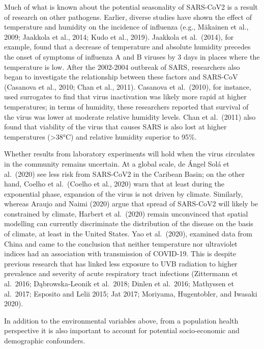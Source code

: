 \documentclass[]{elsarticle} %
\begin{document}
Much of what is known about the potential seasonality of SARS-CoV2 is a
result of research on other pathogens. Earlier, diverse studies have
shown the effect of temperature and humidity on the incidence of
influenza (e.g., Mäkainen et al., 2009; Jaakkola et al., 2014; Kudo et
al., 2019). Jaakkola et al.~(2014), for example, found that a decrease
of temperature and absolute humidity precedes the onset of symptoms of
influenza A and B viruses by 3 days in places where the temperature is
low. After the 2002-2004 outbreak of SARS, researchers also began to
investigate the relationship between these factors and SARS-CoV
(Casanova et al., 2010; Chan et al., 2011). Casanova et al.~(2010), for
instance, used surrogates to find that virus inactivation was likely
more rapid at higher temperatures; in terms of humidity, these
researchers reported that survival of the virus was lower at moderate
relative humidity levels. Chan et al.~(2011) also found that viability
of the virus that causes SARS is also lost at higher temperatures
(\textgreater38°C) and relative humidity superior to 95\%.

Whether results from laboratory experiments will hold when the virus
circulates in the community remains uncertain. At a global scale, de
Ángel Solá et al.~(2020) see less risk from SARS-CoV2 in the Caribean
Basin; on the other hand, Coelho et al.~(Coelho et al., 2020) warn that
at least during the exponential phase, expansion of the virus is not
driven by climate. Similarly, whereas Araujo and Naimi (2020) argue that
spread of SARS-CoV2 will likely be constrained by climate, Harbert et
al.~(2020) remain unconvinced that spatial modelling can currently
discriminate the distribution of the disease on the basis of climate, at
least in the United States. Yao et al.~(2020), examined data from China
and came to the conclusion that neither temperature nor ultraviolet
indices had an association with transmission of COVID-19. This is
despite previous research that has linked less exposure to UVB radiation
to higher prevalence and severity of acute respiratory tract infections
(Zittermann et al.~2016; Dąbrowska-Leonik et al.~2018; Dinlen et
al.~2016; Mathyssen et al.~2017; Esposito and Lelii 2015; Jat 2017;
Moriyama, Hugentobler, and Iwasaki 2020).

In addition to the environmental variables above, from a population
health perspective it is also important to account for potential
socio-economic and demographic confounders.
\end{document}
